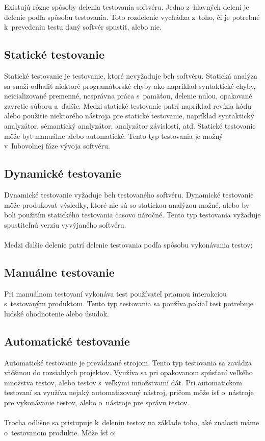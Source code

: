 Existujú rôzne spôsoby delenia testovania softvéru. Jedno z~hlavných delení je delenie podľa spôsobu testovania.
Toto rozdelenie vychádza z~toho, či je potrebné k~prevedeniu testu daný softvér spustiť, alebo nie.
\subsection*{Statické testovanie}
Statické testovanie je testovanie, ktoré nevyžaduje beh softvéru. Statická analýza sa snaží odhaliť niektoré
programátorské chyby ako napríklad syntaktické chyby, neicializované premenné, nesprávna práca s~pamäťou, delenie nulou, opakované zavretie súboru a~ďalšie. 
Medzi statické testovanie patrí napríklad revízia kódu alebo použitie niektorého nástroja pre statické testovanie, napríklad syntaktický analyzátor, sémantický
analyzátor, analyzátor závislostí, atď. Statické testovanie môže byť manuálne alebo automatické. Tento typ testovania je možný v~ľubovolnej fáze vývoja softvéru.
\subsection*{Dynamické testovanie}
Dynamické testovanie vyžaduje beh testovaného softvéru. Dynamické testovanie môže produkovať výsledky, ktoré nie sú so statickou analýzou možné, alebo 
by boli použitím statického testovania časovo náročné. Tento typ testovania vyžaduje spustiteľnú verziu vyvýjaného softvéru.
\\
\\
Medzi ďalšie delenie patrí delenie testovania podľa spôsobu vykonávania testov:
\subsection*{Manuálne testovanie}
Pri manuálnom testovaní vykonáva test používateľ priamou interakciou s~testovaným produktom. 
Tento typ testovania sa používa,pokiaľ test potrebuje ľudské ohodnotenie alebo úsudok.

\subsection*{Automatické testovanie}
Automatické testovanie je prevádzané strojom.
Tento typ testovania sa zavádza väčšinou do rozsiahlych projektov.
Využíva sa pri opakovanom spúsťaní veľkého množstva testov, alebo testov s~veľkými množstvami dát.
Pri automatickom testovaní sa využíva nejaký automatizovaný nástroj, pričom môže ísť o~nástroje 
pre vykonávanie testov, alebo o~nástroje pre správu testov.
\\
\\
Trocha odlišne sa pristupuje k~deleniu testov na základe toho, aké znalosti máme o~testovanom produkte.
Môže ísť o:
